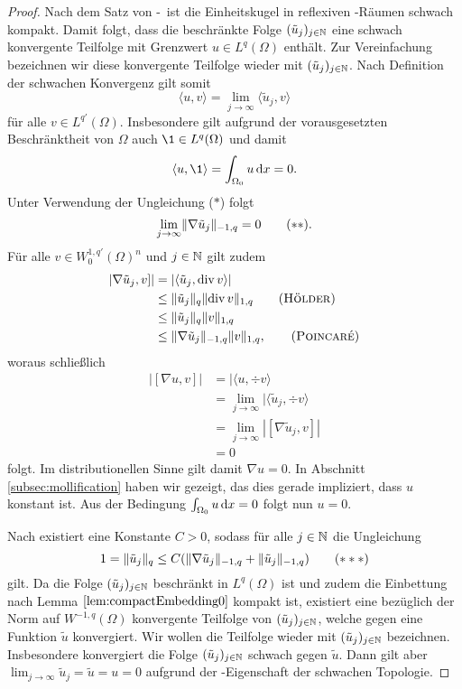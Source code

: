 \begin{proof}
  Nach dem Satz von \banach\hyp{}\alaoglu\ ist die Einheitskugel in reflexiven \banach\hyp{}Räumen schwach kompakt.
  Damit folgt, dass die beschränkte Folge $(\tilde u_j)_{j \in \mathbb{N}}$ eine schwach konvergente Teilfolge mit Grenzwert $u \in L^q(\Omega)$ enthält.
  Zur Vereinfachung bezeichnen wir diese konvergente Teilfolge wieder mit $(\tilde u_j)_{j \in \mathbb{N}}$.
  Nach Definition der schwachen Konvergenz gilt somit
  $$
  \langle u, v \rangle = \lim_{j \to \infty} \langle \tilde u_j, v \rangle
  $$
  für alle $v \in L^{q'}(\Omega)$.
  Insbesondere gilt aufgrund der vorausgesetzten Beschränktheit von $\Omega$ auch $\1 \in L^q(\Omega)$ und damit
  $$
  \langle u, \1 \rangle = \int_{\Omega_0} u \d x = 0.
  $$
  Unter Verwendung der Ungleichung ($\ast$) folgt
  \begin{displaymath}
    \lim_{j \to \infty} \lVert \nabla \tilde u_j \rVert_{-1,q} = 0 \tag{$\ast\ast$}.
  \end{displaymath}
  Für alle $v \in W_0^{1,q'}(\Omega)^n$ und $j \in \mathbb{N}$ gilt zudem 
  \begin{align*}
    |\nabla \tilde u_j, v]|
    &= |\langle \tilde u_j, \div v \rangle| \\
    &\leq \norm{\tilde u_j}_q \norm{\div v}_{1,q} \tag{\hoelder}\\
    &\leq \norm{\tilde u_j}_q \norm{v}_{1,q} \\
    &\leq \norm{\nabla \tilde u_j}_{-1,q} \norm{v}_{1,q}, \tag{\poincare}
  \end{align*}
  woraus schließlich
  \begin{align*}
    |[\nabla u, v]|
    &= |\langle u, \div v \rangle \\
    &= \lim_{j \to \infty}|\langle \tilde u_j, \div v \rangle \\
    &= \lim_{j \to \infty} |[\nabla \tilde u_j, v ]| \\
    &= 0
  \end{align*}
  folgt.
  Im distributionellen Sinne gilt damit $\nabla u = 0$.
  In Abschnitt \ref{subsec:mollification} haben wir gezeigt, das dies gerade impliziert, dass $u$ konstant ist.
  Aus der Bedingung $\int_{\Omega_0} u \, {\operatorname{d}\!{x}} = 0$ folgt nun $u = 0$. 
  
  Nach \cite[S.45 Lemma 1.1.3]{sohr2001navier} existiert eine Konstante $C > 0$, sodass für alle $j \in \mathbb{N}$ die Ungleichung
  \begin{displaymath}
    1 = \lVert \tilde u_j \rVert_q \leq C (\lVert \nabla \tilde u_j \rVert_{-1,q} + \lVert \tilde u_j \rVert_{-1,q}) \tag{$\ast\ast\ast$}
  \end{displaymath}
  gilt.
  Da die Folge $(\tilde u_j)_{j \in \mathbb{N}}$ beschränkt in $L^q(\Omega)$ ist und zudem die Einbettung nach Lemma $\ref{lem:compactEmbedding0}$ kompakt ist, existiert eine bezüglich der Norm auf $W^{-1,q}(\Omega)$ konvergente Teilfolge von $(\tilde u_j)_{j \in \mathbb{N}}$, welche gegen eine Funktion $\tilde u$ konvergiert. 
  Wir wollen die Teilfolge wieder mit $(\tilde u_j)_{j \in \mathbb{N}}$ bezeichnen.
  Insbesondere konvergiert die Folge $(\tilde u_j)_{j \in \mathbb{N}}$ schwach gegen $\tilde u$.
  Dann gilt aber $\lim_{j \to \infty} \tilde u_j = \tilde u = u = 0$ aufgrund der \hausdorff\hyp{}Eigenschaft der schwachen Topologie.


\end{proof}
